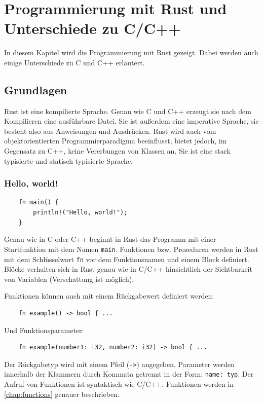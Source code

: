 \chapter{Programmierung mit Rust und Unterschiede zu C/C++}\label{chap:prog}

In diesem Kapitel wird die Programmierung mit Rust gezeigt. Dabei werden auch einige Unterschiede zu C und C++ erläutert.


\section{Grundlagen}

Rust ist eine kompilierte Sprache. Genau wie C und C++ erzeugt sie nach dem Kompilieren eine ausführbare Datei. Sie ist außerdem eine imperative Sprache, sie besteht also aus Anweisungen und Ausdrücken. Rust wird auch vom objektorientierten Programmierparadigma beeinflusst, bietet jedoch, im Gegensatz zu C++, keine Vererbungen von Klassen an. Sie ist eine stark typisierte und statisch typisierte Sprache.

\subsection{Hello, world!}\label{chap:helloworld}

\begin{lstlisting}
    fn main() {
        println!("Hello, world!");
    }
\end{lstlisting}

Genau wie in C oder C++ beginnt in Rust das Programm mit einer Startfunktion mit dem Namen \verb"main". Funktionen bzw. Prozeduren werden in Rust mit dem Schlüsselwort \verb"fn" vor dem Funktionsnamen und einem Block definiert. Blöcke verhalten sich in Rust genau wie in C/C++ hinsichtlich der Sichtbarkeit von Variablen (Verschattung ist möglich).

Funktionen können auch mit einem Rückgabewert definiert werden:

\begin{lstlisting}
    fn example() -> bool { ...
\end{lstlisting}

Und Funktionsparameter:

\begin{lstlisting}
    fn example(number1: i32, number2: i32) -> bool { ...
\end{lstlisting}

Der Rückgabetyp wird mit einem Pfeil (\verb"->") angegeben. Parameter werden innerhalb der Klammern durch Kommata getrennt in der Form: \verb"name: typ". Der Aufruf von Funktionen ist syntaktisch wie C/C++. Funktionen werden in \autoref{chap:functions} genauer beschrieben.

